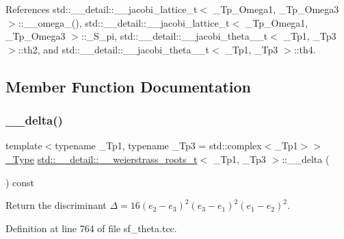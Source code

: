 References std\+::\+\_\+\+\_\+detail\+::\+\_\+\+\_\+jacobi\+\_\+lattice\+\_\+t$<$ \+\_\+\+Tp\+\_\+\+Omega1, \+\_\+\+Tp\+\_\+\+Omega3 $>$\+::\+\_\+\+\_\+omega\+\_(), std\+::\+\_\+\+\_\+detail\+::\+\_\+\+\_\+jacobi\+\_\+lattice\+\_\+t$<$ \+\_\+\+Tp\+\_\+\+Omega1, \+\_\+\+Tp\+\_\+\+Omega3 $>$\+::\+\_\+\+S\+\_\+pi, std\+::\+\_\+\+\_\+detail\+::\+\_\+\+\_\+jacobi\+\_\+theta\+\_\+\_\+t$<$ \+\_\+\+Tp1, \+\_\+\+Tp3 $>$\+::th2, and std\+::\+\_\+\+\_\+detail\+::\+\_\+\+\_\+jacobi\+\_\+theta\+\_\+\_\+t$<$ \+\_\+\+Tp1, \+\_\+\+Tp3 $>$\+::th4.



\subsection{Member Function Documentation}
\mbox{\label{structstd_1_1____detail_1_1____weierstrass__roots__t_a03182b9fb82a1895dde603836e659776}} 
\subsubsection{\texorpdfstring{\+\_\+\+\_\+delta()}{\_\_delta()}}
{\footnotesize\ttfamily template$<$typename \+\_\+\+Tp1, typename \+\_\+\+Tp3 = std\+::complex$<$\+\_\+\+Tp1$>$$>$ \\
\hyperlink{structstd_1_1____detail_1_1____weierstrass__roots__t_acda3e0386962aea322dea870977b67ed}{\+\_\+\+Type} \hyperlink{structstd_1_1____detail_1_1____weierstrass__roots__t}{std\+::\+\_\+\+\_\+detail\+::\+\_\+\+\_\+weierstrass\+\_\+roots\+\_\+t}$<$ \+\_\+\+Tp1, \+\_\+\+Tp3 $>$\+::\+\_\+\+\_\+delta (\begin{DoxyParamCaption}{ }\end{DoxyParamCaption}) const\hspace{0.3cm}{\ttfamily [inline]}}



Return the discriminant $ \Delta = 16(e_2 - e_3)^2(e_3 - e_1)^2(e_1 - e_2)^2 $. 



Definition at line 764 of file sf\+\_\+theta.\+tcc.



